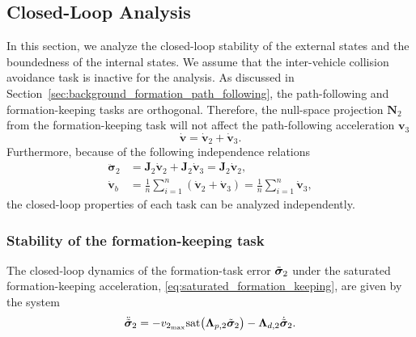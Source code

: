 \subsection{Closed-Loop Analysis}\label{sec:closed_loop}
In this section, we analyze the closed-loop stability of the external states and the boundedness of the internal states. We assume that the inter-vehicle collision avoidance task is inactive for the analysis. As discussed in Section~\ref{sec:background_formation_path_following}, the path-following and formation-keeping tasks are orthogonal. Therefore, the null-space projection $\mathbf{N}_2$ from the formation-keeping task will not affect the path-following acceleration $\mathbf{v}_3$
\begin{equation}\label{eq:commanded_acceleration_inactive_colav}
    \dot{\mathbf{v}} = \dot{\mathbf{v}}_2 + \dot{\mathbf{v}}_3.
\end{equation}
Furthermore, because of the following independence relations
\begin{align}
    \ddot{\bm{\sigma}}_2 &= \mathbf{J}_2\dot{\mathbf{v}}_2 + \mathbf{J}_2\dot{\mathbf{v}}_3 = \mathbf{J}_2\dot{\mathbf{v}}_2,\\
    \dot{\mathbf{v}}_b &= \frac{1}{n}\sum_{i=1}^n (\dot{\mathbf{v}}_2 + \dot{\mathbf{v}}_3) = \frac{1}{n}\sum_{i=1}^n \dot{\mathbf{v}}_3,
\end{align}
the closed-loop properties of each task can be analyzed independently.


\subsubsection{Stability of the formation-keeping task}
The closed-loop dynamics of the formation-task error $\Tilde{\bm{\sigma}}_2$ under the saturated formation-keeping acceleration, \eqref{eq:saturated_formation_keeping}, are given by the system
\begin{equation}\label{eq:task_2_dynamics}
    \ddot{\Tilde{\bm{\sigma}}}_2 = - v_{2_{\max}}\mathrm{sat}\bigl(\mathbf{\Lambda}_{p,2}\Tilde{\bm{\sigma}}_2\bigr) - \mathbf{\Lambda}_{d,2} \dot{\Tilde{\bm{\sigma}}}_2.
\end{equation}

